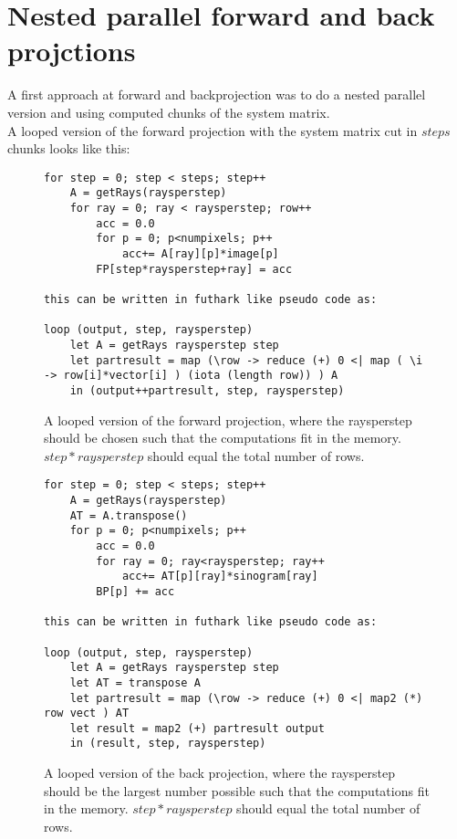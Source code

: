 \section{Nested parallel forward and back projctions}
A first approach at forward and backprojection was to do a nested parallel version and using computed chunks of the system matrix.\\
A looped version of the forward projection with the system matrix cut in $steps$ chunks looks like this:

\begin{figure}[h]
\begin{lstlisting}[frame=single]
for step = 0; step < steps; step++
	A = getRays(raysperstep)
	for ray = 0; ray < raysperstep; row++
		acc = 0.0
		for p = 0; p<numpixels; p++
			acc+= A[ray][p]*image[p]
		FP[step*raysperstep+ray] = acc

this can be written in futhark like pseudo code as:

loop (output, step, raysperstep)
	let A = getRays raysperstep step
	let partresult = map (\row -> reduce (+) 0 <| map ( \i -> row[i]*vector[i] ) (iota (length row)) ) A
	in (output++partresult, step, raysperstep)
\end{lstlisting}
\caption{A looped version of the forward projection, where the raysperstep should be chosen such that the computations fit in the memory. $step*raysperstep$ should equal the total number of rows.}
\end{figure}
\begin{figure}[h]
\begin{lstlisting}[frame=single]
for step = 0; step < steps; step++
	A = getRays(raysperstep)
	AT = A.transpose()
	for p = 0; p<numpixels; p++
		acc = 0.0
		for ray = 0; ray<raysperstep; ray++
			acc+= AT[p][ray]*sinogram[ray]
		BP[p] += acc

this can be written in futhark like pseudo code as:

loop (output, step, raysperstep)
	let A = getRays raysperstep step
	let AT = transpose A
	let partresult = map (\row -> reduce (+) 0 <| map2 (*) row vect ) AT
	let result = map2 (+) partresult output
	in (result, step, raysperstep)
\end{lstlisting}
  \caption{A looped version of the back projection, where the raysperstep should be the largest number possible such that the computations fit in the memory. $step*raysperstep$ should equal the total number of rows.}
\end{figure}
